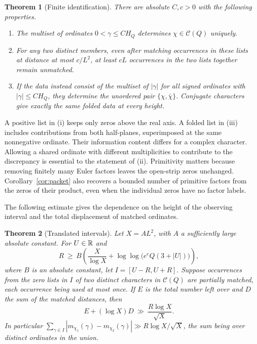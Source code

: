 \documentclass[11pt,letterpaper]{article}
\newtheorem{theorem}{Theorem}
\begin{document}
\begin{theorem}[Finite identification]\label{th:main}
There are absolute $C,c>0$ with the following properties.
\begin{enumerate}
\item The multiset of ordinates $0<\gamma\le C H_Q$ determines $\chi\in\mathcal C(Q)$ uniquely.
\item For any two distinct members, even after matching occurrences in these lists at distance at most $c/L^2$, at least $cL$ occurrences in the two lists together remain unmatched.
\item If the data instead consist of the multiset of $|\gamma|$ for all signed ordinates with $|\gamma|\le C H_Q$, they determine the unordered pair $\{\chi,\bar\chi\}$. Conjugate characters give exactly the same folded data at every height.
\end{enumerate}
\end{theorem}

A positive list in (i) keeps only zeros above the real axis. A folded list in (iii) includes contributions from both half-planes, superimposed at the same nonnegative ordinate. Their information content differs for a complex character. Allowing a shared ordinate with different multiplicities to contribute to the discrepancy is essential to the statement of (ii). Primitivity matters because removing finitely many Euler factors leaves the open-strip zeros unchanged. Corollary~\ref{cor:packet} also recovers a bounded number of primitive factors from the zeros of their product, even when the individual zeros have no factor labels.

\clearpage
The following estimate gives the dependence on the height of the observing interval and the total displacement of matched ordinates.

\begin{theorem}[Translated intervals]\label{th:shift}
Let $X=A L^2$, with $A$ a sufficiently large absolute constant. For $U\in\mathbb R$ and
\begin{equation}\label{eq:height}
 R\ \ge\ B\left(\frac X{\log X}+\log\log\big(e^e Q(3+|U|)\big)\right),
\end{equation}
where $B$ is an absolute constant, let $I=[U-R,U+R]$. Suppose occurrences from the zero lists in $I$ of two distinct characters in $\mathcal C(Q)$ are partially matched, each occurrence being used at most once. If $E$ is the total number left over and $D$ the sum of the matched distances, then
\begin{equation}\label{eq:transport}
 E+(\log X)D\ \gg\ \frac{R\log X}{\sqrt X}.
\end{equation}
In particular $\sum_{\gamma\in I}|m_{\chi_1}(\gamma)-m_{\chi_2}(\gamma)|\gg R\log X/\sqrt X$, the sum being over distinct ordinates in the union.
\end{theorem}
\end{document}
